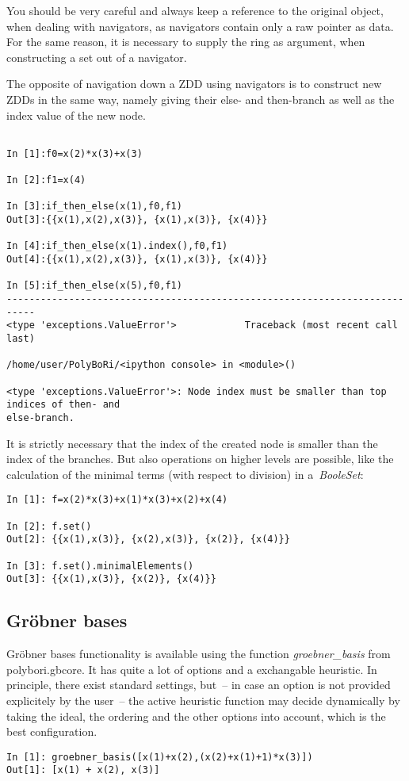 \documentclass[]{article}
\newcommand{\Groebner}{Gr\"{o}bner\xspace}
\newcommand{\functionname}[1]{\textit{#1}\xspace}
\begin{document}
You should be very careful and always keep a reference to the original object, when dealing with navigators, as navigators contain only a raw pointer as data.
For the same reason, it is necessary to supply the ring as argument, when constructing a set out of a navigator.

The opposite of navigation down a ZDD using navigators is to construct new ZDDs in the same way, namely giving their else- and then-branch as well as the index value of the new node.

\begin{verbatim}
    
In [1]:f0=x(2)*x(3)+x(3)

In [2]:f1=x(4)

In [3]:if_then_else(x(1),f0,f1)
Out[3]:{{x(1),x(2),x(3)}, {x(1),x(3)}, {x(4)}}

In [4]:if_then_else(x(1).index(),f0,f1)
Out[4]:{{x(1),x(2),x(3)}, {x(1),x(3)}, {x(4)}}

In [5]:if_then_else(x(5),f0,f1)
---------------------------------------------------------------------------
<type 'exceptions.ValueError'>            Traceback (most recent call last)

/home/user/PolyBoRi/<ipython console> in <module>()

<type 'exceptions.ValueError'>: Node index must be smaller than top indices of then- and
else-branch.
\end{verbatim}

It is strictly necessary that the index of the created node is smaller than the index of the branches.
%
%
But also operations on higher levels are possible, like the calculation of the minimal terms (with respect to division) in a~\functionname{BooleSet}:
\begin{verbatim}
In [1]: f=x(2)*x(3)+x(1)*x(3)+x(2)+x(4)

In [2]: f.set()
Out[2]: {{x(1),x(3)}, {x(2),x(3)}, {x(2)}, {x(4)}}

In [3]: f.set().minimalElements()
Out[3]: {{x(1),x(3)}, {x(2)}, {x(4)}}
\end{verbatim}
\subsection{\Groebner bases}
\Groebner bases functionality is available using the function \functionname{groebner\_basis} from polybori.gbcore.
It has quite a lot of options and a exchangable heuristic.
In principle, there exist  standard settings, but~-- in case an option is not
provided explicitely by the user~-- the active heuristic function
may decide dynamically by taking the ideal, the ordering and the other options into account, which is the best configuration.
\begin{verbatim}
In [1]: groebner_basis([x(1)+x(2),(x(2)+x(1)+1)*x(3)])
Out[1]: [x(1) + x(2), x(3)]
\end{verbatim}
\end{document}

